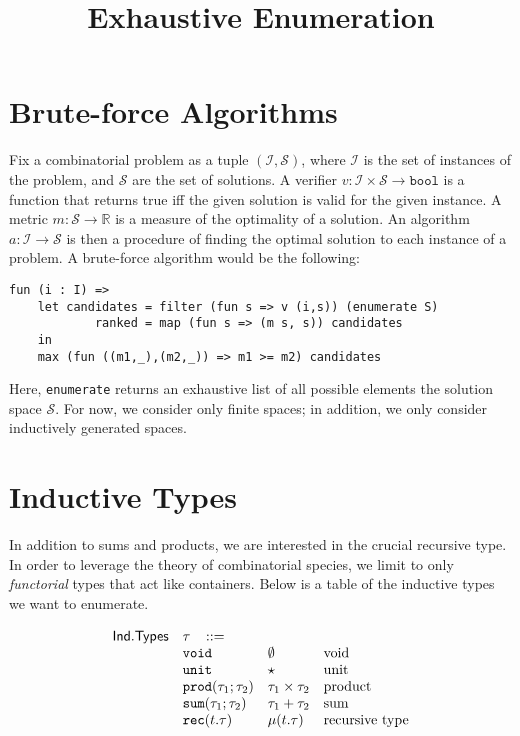 \documentclass[11pt]{article}
\title{Exhaustive Enumeration}
\newcommand{\ms}[1]{\ensuremath{\mathsf{#1}}}
\newcommand{\irl}[1]{\mathtt{#1}}
\begin{document}
\maketitle

\section{Brute-force Algorithms}

Fix a combinatorial problem as a tuple $(\mathcal{I},\mathcal{S})$, where $\mathcal{I}$ is the set of instances 
of the problem, and $\mathcal{S}$ are the set of solutions. A verifier 
$v : \mathcal{I} \times \mathcal{S} \to \irl{bool}$ is a function that returns true iff the given solution 
is valid for the given instance.  
A metric $m : \mathcal{S} \to \mathbb{R}$ is a measure of the optimality of a solution. 
An algorithm $a : \mathcal{I} \to \mathcal{S}$ is then a procedure of finding the optimal solution 
to each instance of a problem. A brute-force algorithm would be the following: 

\begin{verbatim}
fun (i : I) => 
	let	candidates = filter (fun s => v (i,s)) (enumerate S)
			ranked = map (fun s => (m s, s)) candidates
	in 
	max (fun ((m1,_),(m2,_)) => m1 >= m2) candidates
\end{verbatim}

Here, \texttt{enumerate} returns an exhaustive list of all possible elements the solution space $\mathcal{S}$. 
For now, we consider only finite spaces; in addition, we only consider inductively generated spaces.

\section{Inductive Types}

In addition to sums and products, we are interested in the crucial recursive type. In order to leverage 
the theory of combinatorial species, we limit to only \emph{functorial} types that act like containers. 
Below is a table of the inductive types we want to enumerate.

\[
\begin{array}{r l l l l}
\ms{Ind. Types} & \tau \,\,\,\,\, ::= \\
	& \irl{void}                	 			& \emptyset											& \text{void}\\
	& \irl{unit}                	 			& \star											& \text{unit}\\
	& \irl{prod}(\tau_1;\tau_2)					& \tau_1 \times \tau_2			&\text{product}\\
	& \irl{sum}(\tau_1;\tau_2)					& \tau_1 + \tau_2			&\text{sum}\\
	& \irl{rec}(t.\tau)								& \mu(t.\tau)					&\text{recursive type}
  \\
\end{array}
\]
\end{document}
